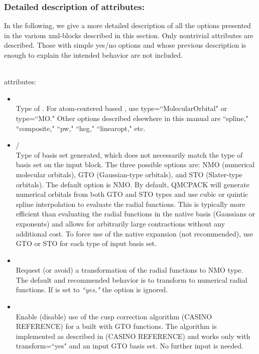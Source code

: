 \subsubsection{Detailed description of attributes:}

In the following, we give a more detailed description of all the options presented in the various xml-blocks described in this section. Only nontrivial attributes are described. Those with simple yes/no options and whose previous description is enough to explain the intended behavior are not included. 

\hspace{1mm} \\

 attributes:

\begin{itemize}
\item {} \\
Type of . For atom-centered based , use type=``MolecularOrbital" or type=``MO." Other options described elsewhere in this manual are ``spline," ``composite," ``pw," ``heg," ``linearopt," etc.
\item {}/ \\
Type of basis set generated, which does not necessarily match the type of basis set on the input block. The three possible options are: NMO (numerical molecular orbitals), GTO (Gaussian-type orbitals), and STO (Slater-type orbitals). The default option is NMO. By default, QMCPACK will generate numerical orbitals from both GTO and STO types and use cubic or quintic spline interpolation to evaluate the radial functions. This is typically more efficient than evaluating the radial functions in the native basis (Gaussians or exponents) and allows for arbitrarily large contractions without any additional cost. To force use of the native expansion (not recommended), use GTO or STO for each type of input basis set.
\item {}\\
Request (or avoid) a transformation of the radial functions to NMO type. The default and recommended behavior is to transform to numerical radial functions. If  is set to \textit{``yes,"} the option  is ignored.  
\item {}\\
Enable (disable) use of the cusp correction algorithm (CASINO REFERENCE) for a  built with GTO functions. The algorithm is implemented as described in (CASINO REFERENCE) and works only with transform=``yes" and an input GTO basis set. No further input is needed. 
\end{itemize}

